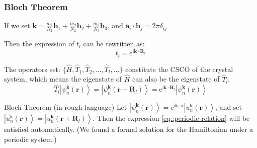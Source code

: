 \documentclass{beamer}
\begin{document}
  \begin{frame}
    \frametitle{Bloch Theorem}
  
    If we set \(\mathbf{k} = \frac{m_1}{N_1}\mathbf{b}_1+\frac{m_2}{N_2}\mathbf{b}_2+\frac{m_3}{N_3}\mathbf{b}_3\), and \(\mathbf{a}_i\cdot\mathbf{b}_j = 2\pi\delta_{ij}\)

    Then the expression of \(t_l\) can be rewritten as:
    \begin{equation}
      t_l = \mathrm{e}^{\mathrm{i}\mathbf{k}\cdot\mathbf{R}_l}
    \end{equation}

    The operators set: \(\{\widehat{H}, \widehat{T}_1, \widehat{T}_2,...,\widehat{T}_l,...\}\) constitute the CSCO of the crystal system, which means the eigenstate of \(\widehat{H}\) can also be the eigenstate of \(\widehat{T}_l\).
    \begin{equation}
      \label{eq::periodic-relation}
      \widehat{T}_l\left|\psi_n^{\mathbf{k}}(\mathbf{r})\right\rangle = \left|\psi_n^{\mathbf{k}}(\mathbf{r}+\mathbf{R}_l)\right\rangle = \mathrm{e}^{\mathrm{i}\mathbf{k}\cdot\mathbf{R}_l}\left|\psi_n^{\mathbf{k}}(\mathbf{r})\right\rangle
    \end{equation}

    \begin{block}{Bloch Theorem (in rough language)}
      Let \(\left|\psi_n^{\mathbf{k}}(\mathbf{r})\right\rangle = \mathrm{e}^{\mathrm{i}\mathbf{k}\cdot\mathbf{r}}\left|u_n^{\mathbf{k}}(\mathbf{r})\right\rangle\), and set \(\left|u_n^{\mathbf{k}}(\mathbf{r})\right\rangle = \left|u_n^{\mathbf{k}}(\mathbf{r}+\mathbf{R}_l)\right\rangle\). Then the expression \eqref{eq::periodic-relation} will be satisfied automatically. (We found a formal solution for the Hamiltonian under a periodic system.)    
    \end{block}

    \end{frame}
\end{document}
